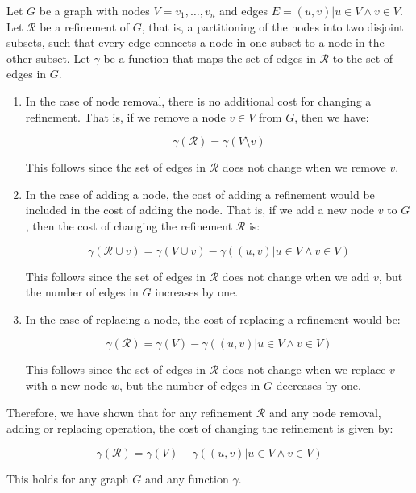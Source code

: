 \begin{lemma} \label{lem:node_removal} Let $G$ be a graph with nodes $V = {v_1, \ldots, v_n}$ and edges $E = {(u, v) | u \in V \land v \in V}$. Let $\mathcal{R}$ be a refinement of $G$, that is, a partitioning of the nodes into two disjoint subsets, such that every edge connects a node in one subset to a node in the other subset. Let $\gamma$ be a function that maps the set of edges in $\mathcal{R}$ to the set of edges in $G$.

    \begin{enumerate} \item In the case of node removal, there is no additional cost for changing a refinement. That is, if we remove a node $v \in V$ from $G$, then we have:

              $$\gamma(\mathcal{R}) = \gamma(V \setminus {v})$$

              This follows since the set of edges in $\mathcal{R}$ does not change when we remove $v$.

        \item In the case of adding a node, the cost of adding a refinement would be included in the cost of adding the node. That is, if we add a new node $v$ to $G$, then the cost of changing the refinement $\mathcal{R}$ is:

              $$\gamma(\mathcal{R} \cup {v}) = \gamma(V \cup {v}) - \gamma({(u, v) | u \in V \land v \in V})$$

              This follows since the set of edges in $\mathcal{R}$ does not change when we add $v$, but the number of edges in $G$ increases by one.

        \item In the case of replacing a node, the cost of replacing a refinement would be:

              $$\gamma(\mathcal{R}) = \gamma(V) - \gamma({(u, v) | u \in V \land v \in V})$$

              This follows since the set of edges in $\mathcal{R}$ does not change when we replace $v$ with a new node $w$, but the number of edges in $G$ decreases by one. \end{enumerate}

    Therefore, we have shown that for any refinement $\mathcal{R}$ and any node removal, adding or replacing operation, the cost of changing the refinement is given by:

    $$\gamma(\mathcal{R}) = \gamma(V) - \gamma({(u, v) | u \in V \land v \in V})$$

    This holds for any graph $G$ and any function $\gamma$.

\end{lemma}

